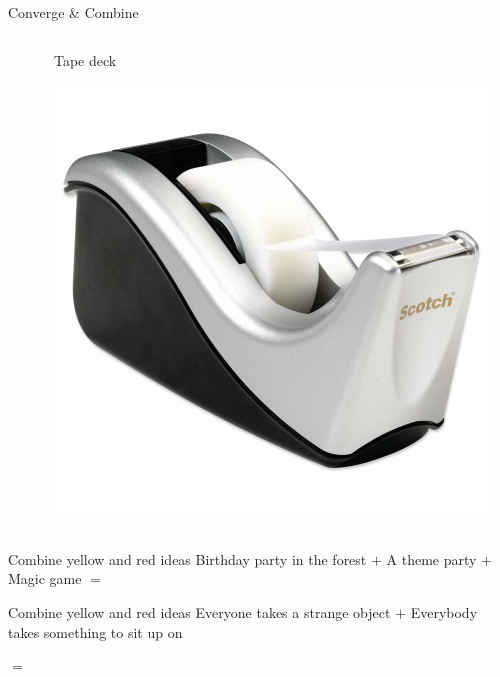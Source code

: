 \documentclass[notes]{beamer}
\begin{document}
\begin{frame}{Converge \& Combine}
\begin{columns}
\begin{column}{0.3\textwidth}
		\end{column} \pause
		\begin{column}{0.3\textwidth}
			\begin{center}
				Tape deck
			\end{center}
			\includegraphics[width=\textwidth]{img/tapedeck.jpg}
		\end{column}
	\end{columns}

\end{frame}

\begin{frame}{Combine yellow and red ideas}
	Birthday party in the forest
	$+$
	A theme party
	$+$
	Magic game
	$=$
	
\end{frame}

\begin{frame}{Combine yellow and red ideas}
Everyone takes a strange object
$+$
Everybody takes something to sit up on


$=$


\end{frame}
\end{document}
